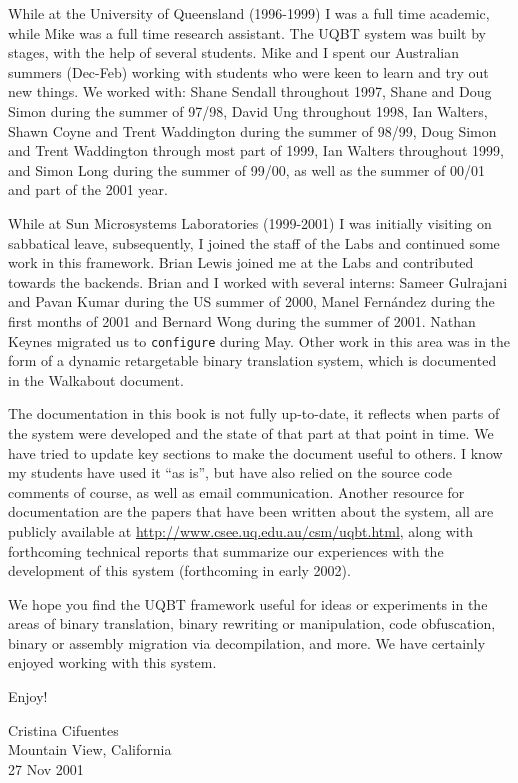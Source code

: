 While at the University of Queensland (1996-1999) I was a full time 
academic, while Mike was a full time research assistant. 
The UQBT system was built by stages, with the help of several students.  
Mike and I spent our Australian summers (Dec-Feb) working with 
students who were keen to learn and try out new things.   
We worked with: Shane Sendall throughout 1997, Shane and Doug Simon 
during the summer of 97/98, David Ung throughout 1998, Ian Walters, 
Shawn Coyne and Trent Waddington during the summer of 98/99, 
Doug Simon and Trent Waddington through most part of 1999, Ian 
Walters throughout 1999, and Simon Long during the summer of 99/00, 
as well as the summer of 00/01 and part of the 2001 year. 

While at Sun Microsystems Laboratories (1999-2001) I was initially 
visiting on sabbatical leave, subsequently, I joined the staff of the 
Labs and continued some work in this framework.  Brian Lewis joined 
me at the Labs and contributed towards the backends.  Brian and I 
worked with several interns: Sameer Gulrajani and Pavan Kumar during 
the US summer of 2000, Manel Fern\'{a}ndez during the first months 
of 2001 and Bernard Wong during the summer of 2001.  Nathan Keynes 
migrated us to \texttt{configure} during May.  Other work in this area 
was in the form of a dynamic retargetable binary translation system, 
which is documented in the Walkabout document.

The documentation in this book is not fully up-to-date, it reflects when 
parts of the system were developed and the state of that part at that 
point in time.  We have tried to update key sections to make the 
document useful to others.  I know my students have used it ``as 
is'', but have also relied on the source code comments of course, as 
well as email communication.  
Another resource for documentation are the papers that have been written
about the system, all are publicly available at 
\url{http://www.csee.uq.edu.au/csm/uqbt.html}, along with forthcoming  
technical reports that summarize our experiences with the development 
of this system (forthcoming in early 2002). 

We hope you find the UQBT framework useful for ideas or experiments 
in the areas of binary translation, binary rewriting or manipulation, 
code obfuscation, binary or assembly migration via decompilation, and more. 
We have certainly enjoyed working with this system. 

Enjoy! 


{\small
\begin{flushright}
Cristina Cifuentes \\
Mountain View, California \\
27 Nov 2001
\end{flushright}
}

